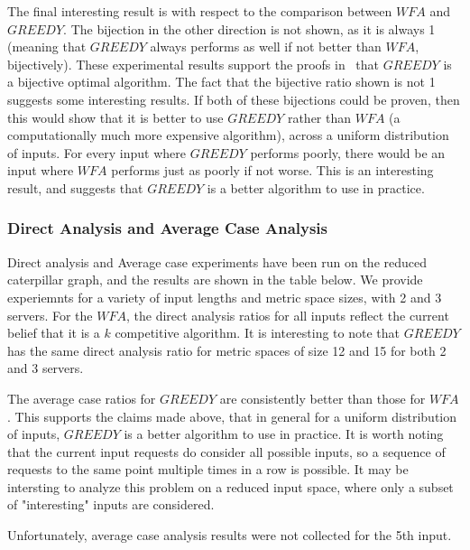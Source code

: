 The final interesting result is with respect to the comparison between $WFA$ and $GREEDY$. The bijection in the other direction is not shown, as it is always 1 (meaning that $GREEDY$ always performs as well if not better than $WFA$, bijectively). These experimental results support the proofs in~\cite{bij2016} that $GREEDY$ is a bijective optimal algorithm. The fact that the bijective ratio shown is not 1 suggests some interesting results. If both of these bijections could be proven, then this would show that it is better to use $GREEDY$ rather than $WFA$ (a computationally much more expensive algorithm), across a uniform distribution of inputs. For every input where $GREEDY$ performs poorly, there would be an input where $WFA$ performs just as poorly if not worse. This is an interesting result, and suggests that $GREEDY$ is a better algorithm to use in practice.

\subsubsection*{Direct Analysis and Average Case Analysis}
Direct analysis and Average case experiments have been run on the reduced caterpillar graph, and the results are shown in the table below. We provide experiemnts for a variety of input lengths and metric space sizes, with 2 and 3 servers. For the $WFA$, the direct analysis ratios for all inputs reflect the current belief that it is a $k$ competitive algorithm. It is interesting to note that $GREEDY$ has the same direct analysis ratio for metric spaces of size 12 and 15 for both 2 and 3 servers.

The average case ratios for $GREEDY$ are consistently better than those for $WFA$. This supports the claims made above, that in general for a uniform distribution of inputs, $GREEDY$ is a better algorithm to use in practice. It is worth noting that the current input requests do consider all possible inputs, so a sequence of requests to the same point multiple times in a row is possible. It may be intersting to analyze this problem on a reduced input space, where only a subset of "interesting" inputs are considered.

Unfortunately, average case analysis results were not collected for the 5th input. 

